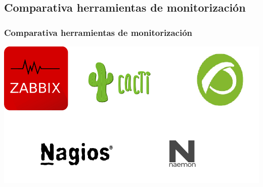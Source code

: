\documentclass{beamer}
\theoremstyle{plain}
\theoremstyle{definition}
\theoremstyle{plain}
\theoremstyle{definition}
\theoremstyle{remark}
\theoremstyle{definition}
\begin{document}
\subsection{Comparativa herramientas de monitorización}
\begin{frame}
	\frametitle{Comparativa herramientas de monitorización}
	\centering
	\includegraphics[scale=0.5]{imagenes/comparativaMonitorizacion.png}
\end{frame}
\end{document}
